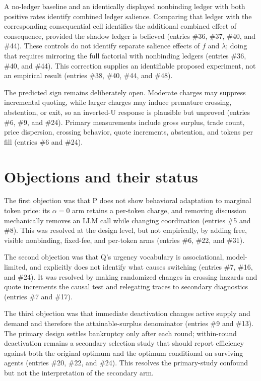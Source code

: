 \documentclass{article}
\begin{document}
A no-ledger baseline and an identically displayed nonbinding ledger with both positive rates identify combined ledger salience.  Comparing that ledger with the corresponding consequential cell identifies the additional combined effect of consequence, provided the shadow ledger is believed (entries \#36, \#37, \#40, and \#44).  These controls do not identify separate salience effects of \(f\) and \(\lambda\); doing that requires mirroring the full factorial with nonbinding ledgers (entries \#36, \#40, and \#44).  This correction supplies an identifiable proposed experiment, not an empirical result (entries \#38, \#40, \#44, and \#48).

The predicted sign remains deliberately open.  Moderate charges may suppress incremental quoting, while larger charges may induce premature crossing, abstention, or exit, so an inverted-U response is plausible but unproved (entries \#6, \#9, and \#24).  Primary measurements include gross surplus, trade count, price dispersion, crossing behavior, quote increments, abstention, and tokens per fill (entries \#6 and \#24).

\section{Objections and their status}
The first objection was that P does not show behavioral adaptation to marginal token price: its \(\alpha=0\) arm retains a per-token charge, and removing discussion mechanically removes an LLM call while changing coordination (entries \#5 and \#8).  This was resolved at the design level, but not empirically, by adding free, visible nonbinding, fixed-fee, and per-token arms (entries \#6, \#22, and \#31).

The second objection was that Q's urgency vocabulary is associational, model-limited, and explicitly does not identify what causes switching (entries \#7, \#16, and \#24).  It was resolved by making randomized changes in crossing hazards and quote increments the causal test and relegating traces to secondary diagnostics (entries \#7 and \#17).

The third objection was that immediate deactivation changes active supply and demand and therefore the attainable-surplus denominator (entries \#9 and \#13).  The primary design settles bankruptcy only after each round; within-round deactivation remains a secondary selection study that should report efficiency against both the original optimum and the optimum conditional on surviving agents (entries \#20, \#22, and \#24).  This resolves the primary-study confound but not the interpretation of the secondary arm.
\end{document}
